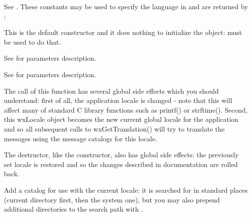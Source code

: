 See .
These constants may be used to specify the language
in  and are returned by 
:


\label{wxlocaledefctor}


This is the default constructor and it does nothing to initialize the object: 
 must be used to do that.


See  for parameters description.


See  for parameters description.

The call of this function has several global side effects which you should
understand: first of all, the application locale is changed - note that this
will affect many of standard C library functions such as printf() or strftime().
Second, this wxLocale object becomes the new current global locale for the
application and so all subsequent calls to wxGetTranslation() will try to
translate the messages using the message catalogs for this locale.



\label{wxlocaledtor}


The destructor, like the constructor, also has global side effects: the previously
set locale is restored and so the changes described in 
 documentation are rolled back.


\label{wxlocaleaddcatalog}



Add a catalog for use with the current locale: it is searched for in standard
places (current directory first, then the system one), but you may also prepend
additional directories to the search path with 
.

